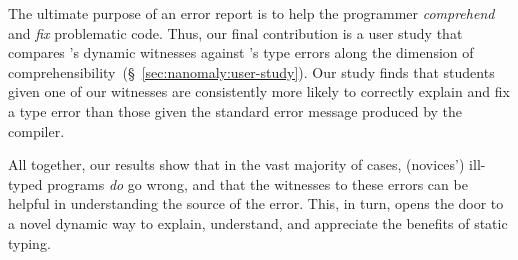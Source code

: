 The ultimate purpose of an error report is to help the programmer
\emph{comprehend} and \emph{fix} problematic code.
%
Thus, our final contribution is a user study that compares \toolname's
dynamic witnesses against \ocaml's type errors along the dimension of
comprehensibility~(\S~\ref{sec:nanomaly:user-study}).
%
Our study finds that students given one of our witnesses are
consistently more likely to correctly explain and fix a type
error than those given the standard error message produced by
the \ocaml compiler.


%
%
%
%
%
%

\smallskip
All together, our results show that in the vast majority of cases, (novices') ill-typed
programs \emph{do} go wrong, and that the witnesses to these errors can be
helpful in understanding the source of the error. This, in turn, opens the
door to a novel dynamic way to explain, understand, and appreciate the
benefits of static typing.


